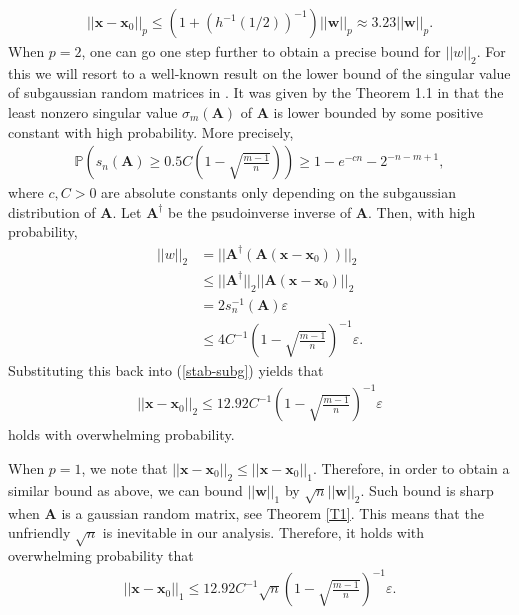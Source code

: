 \documentclass[11pt]{article}
\numberwithin{equation}{section}
\theoremstyle{plain}
\theoremstyle{definition}
\def\P{{\mathbb P}}
\def\A{{\mathbf A}}
\def\x{{\mathbf x}}
\def\s{{\sigma}}
\def\e{{\varepsilon}}
\def\w{{\mathbf{w}}}
\begin{document}
\begin{align*}
||\x-\x_0||_p\leq (1+(h^{-1}(1/2))^{-1})||\w||_p\approx 3.23||\w||_p.  
\end{align*}
When $p=2$, one can go one step further to obtain a precise bound for $||w||_2$. For this we will resort to a well-known result on the lower bound of the singular value of subgaussian random matrices in \cite{rudelson2009smallest}. It was given by the Theorem 1.1 in \cite{rudelson2009smallest} that the least nonzero singular value $\s_m(\A)$ of $\A$ is lower bounded by some positive constant with high probability. More precisely, 
\begin{align}
\P\left(s_n(\A)\geq 0.5C\left(1-\sqrt{\frac{m-1}{n}}\right)\right)\geq 1-e^{-cn}-2^{-n-m+1},\label{stab-subg}
\end{align}
where $c, C>0$ are absolute constants only depending on the subgaussian distribution of $\A$. Let $\A^\dagger$ be the psudoinverse inverse of $\A$. Then, with high probability,  
\begin{align*}
||w||_2&=||\A^\dagger(\A(\x-\x_0))||_2\\
&\leq ||\A^\dagger||_2||\A(\x-\x_0)||_2\\
& = 2s^{-1}_n(\A)\e\\
&\leq 4C^{-1}\left(1-\sqrt{\frac{m-1}{n}}\right)^{-1}\e.   
\end{align*}
Substituting this back into (\ref{stab-subg}) yields that
\begin{align*}
||\x-\x_0||_2\leq 12.92C^{-1}\left(1-\sqrt{\frac{m-1}{n}}\right)^{-1}\e
\end{align*}
holds with overwhelming probability.

When $p=1$, we note that $||\x-\x_0||_2\leq ||\x-\x_0||_1$. Therefore, in order to obtain a similar bound as above, we can bound $||\w||_1$ by $\sqrt{n}||\w||_2$. Such bound is sharp when $\A$ is a gaussian random matrix, see Theorem \ref{T1}. This means that the unfriendly $\sqrt{n}$ is inevitable in our analysis. Therefore, it holds with overwhelming probability that  
\begin{align*}
||\x-\x_0||_1\leq 12.92C^{-1}\sqrt{n}\left(1-\sqrt{\frac{m-1}{n}}\right)^{-1}\e.
\end{align*}


     

%
%
%

\newpage
\printbibliography
  
\end{document}

